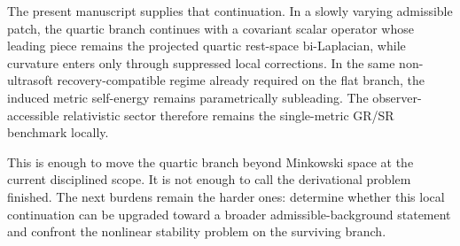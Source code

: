 \documentclass[11pt]{article}
\begin{document}
The present manuscript supplies that continuation. In a slowly varying admissible patch, the quartic branch continues with a covariant scalar operator whose leading piece remains the projected quartic rest-space bi-Laplacian, while curvature enters only through suppressed local corrections. In the same non-ultrasoft recovery-compatible regime already required on the flat branch, the induced metric self-energy remains parametrically subleading. The observer-accessible relativistic sector therefore remains the single-metric GR/SR benchmark locally.

This is enough to move the quartic branch beyond Minkowski space at the current disciplined scope. It is not enough to call the derivational problem finished. The next burdens remain the harder ones: determine whether this local continuation can be upgraded toward a broader admissible-background statement and confront the nonlinear stability problem on the surviving branch.
\end{document}
